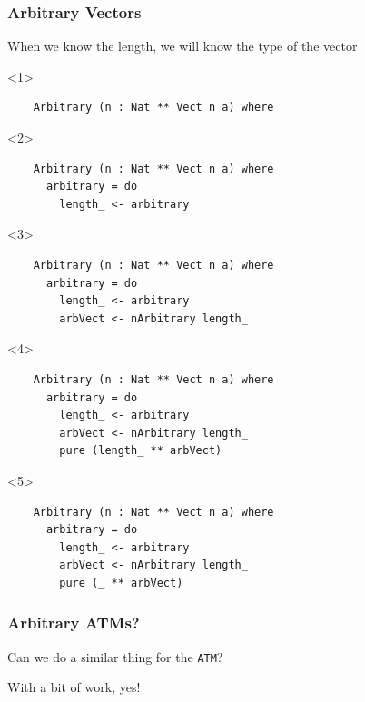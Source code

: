 \documentclass[compress]{beamer}
\begin{document}
\begin{frame}[fragile]
  \frametitle{Arbitrary Vectors}

  \large

  When we know the length, we will know the type of the vector

  \begin{onlyenv}<1>
  \begin{verbatim}
    Arbitrary (n : Nat ** Vect n a) where
  \end{verbatim}
  \end{onlyenv}

  \begin{onlyenv}<2>
  \begin{verbatim}
    Arbitrary (n : Nat ** Vect n a) where
      arbitrary = do
        length_ <- arbitrary
  \end{verbatim}
  \end{onlyenv}

  \begin{onlyenv}<3>
  \begin{verbatim}
    Arbitrary (n : Nat ** Vect n a) where
      arbitrary = do
        length_ <- arbitrary
        arbVect <- nArbitrary length_
  \end{verbatim}
  \end{onlyenv}

  \begin{onlyenv}<4>
  \begin{verbatim}
    Arbitrary (n : Nat ** Vect n a) where
      arbitrary = do
        length_ <- arbitrary
        arbVect <- nArbitrary length_
        pure (length_ ** arbVect)
  \end{verbatim}
  \end{onlyenv}

  \begin{onlyenv}<5>
  \begin{verbatim}
    Arbitrary (n : Nat ** Vect n a) where
      arbitrary = do
        length_ <- arbitrary
        arbVect <- nArbitrary length_
        pure (_ ** arbVect)
  \end{verbatim}
  \end{onlyenv}

\end{frame}


\begin{frame}[fragile]
  \frametitle{Arbitrary ATMs?}

  \large

  \begin{center}
    Can we do a similar thing for the \texttt{ATM}?

    \pause

    With a bit of work, yes!
  \end{center}

\end{frame}
\end{document}
